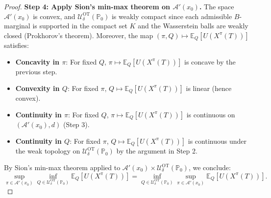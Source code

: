 \documentclass[11pt]{article}
\theoremstyle{definition}
\begin{document}
\begin{proof}
\textbf{Step 4: Apply Sion’s min-max theorem on $\mathcal{A}'(x_0)$.} The space $\mathcal{A}'(x_0)$ is convex, and $\mathcal{U}^{\text{OT}}_{\delta}(\mathbb{P}_0)$ is weakly compact since each admissible $B$-marginal is supported in the compact set $K$ and the Wasserstein %
balls are weakly closed (Prokhorov’s theorem).
Moreover, the map $(\pi, {Q}) \mapsto \mathbb{E}_{Q}[U(X^\pi(T))]$ satisfies:
\begin{itemize}
    \item \textbf{Concavity in $\pi$}: For fixed ${Q}$, $\pi \mapsto \mathbb{E}_{Q}[U(X^\pi(T))]$ is concave by the previous step.
    \item \textbf{Convexity in ${Q}$}: For fixed $\pi$, ${Q} \mapsto \mathbb{E}_{Q}[U(X^\pi(T))]$ is linear (hence convex).
    \item \textbf{Continuity in $\pi$}: For fixed ${Q}$, $\pi \mapsto \mathbb{E}_{Q}[U(X^\pi(T))]$ is continuous on $(\mathcal{A}'(x_0),d)$ (Step 3).
    \item \textbf{Continuity in ${Q}$}: For fixed $\pi$, ${Q} \mapsto \mathbb{E}_{Q}[U(X^\pi(T))]$ is continuous under the weak topology on $\mathcal{U}^{\text{OT}}_{\delta}(\mathbb{P}_0)$ by the argument in Step 2.
\end{itemize}
By Sion’s min-max theorem applied to $\mathcal{A}'(x_0)\times\mathcal{U}^{\text{OT}}_{\delta}(\mathbb{P}_0)$, we conclude:
$$
\sup_{\pi \in \mathcal{A}'(x_0)} \inf_{{Q} \in \mathcal{U}^{\text{OT}}_{\delta}(\mathbb{P}_0)} \mathbb{E}_{Q}[U(X^\pi(T))] = \inf_{{Q} \in \mathcal{U}^{\text{OT}}_{\delta}(\mathbb{P}_0)} \sup_{\pi \in \mathcal{A}'(x_0)} \mathbb{E}_{Q}[U(X^\pi(T))].
$$




\end{proof}
\end{document}

